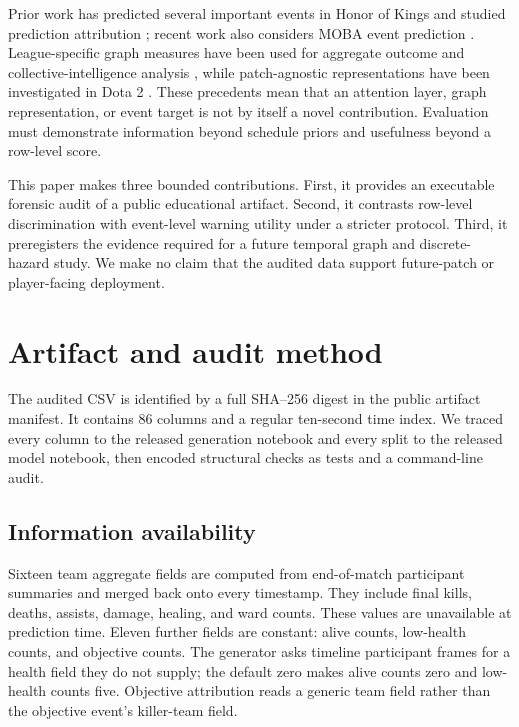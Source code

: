 \documentclass[10pt]{article}
\begin{document}
Prior work has predicted several important events in Honor of Kings and studied
prediction attribution \cite{yang2022events}; recent work also considers MOBA
event prediction \cite{vardakis2026moba}. League-specific graph measures have
been used for aggregate outcome and collective-intelligence analysis
\cite{caldeira2025collective}, while patch-agnostic representations have been
investigated in Dota 2 \cite{chitayat2023meta}. These precedents mean that an
attention layer, graph representation, or event target is not by itself a novel
contribution. Evaluation must demonstrate information beyond schedule priors
and usefulness beyond a row-level score.

This paper makes three bounded contributions. First, it provides an executable
forensic audit of a public educational artifact. Second, it contrasts
row-level discrimination with event-level warning utility under a stricter
protocol. Third, it preregisters the evidence required for a future temporal
graph and discrete-hazard study. We make no claim that the audited data support
future-patch or player-facing deployment.

\section{Artifact and audit method}

The audited CSV is identified by a full SHA--256 digest in the public artifact
manifest. It contains 86 columns and a regular ten-second time index. We traced every
column to the released generation notebook and every split to the released
model notebook, then encoded structural checks as tests and a command-line
audit.

\subsection{Information availability}

Sixteen team aggregate fields are computed from end-of-match participant
summaries and merged back onto every timestamp. They include final kills,
deaths, assists, damage, healing, and ward counts. These values are unavailable
at prediction time. Eleven further fields are constant: alive counts, low-health
counts, and objective counts. The generator asks timeline participant frames
for a health field they do not supply; the default zero makes alive counts zero
and low-health counts five. Objective attribution reads a generic team field
rather than the objective event's killer-team field.
\end{document}
